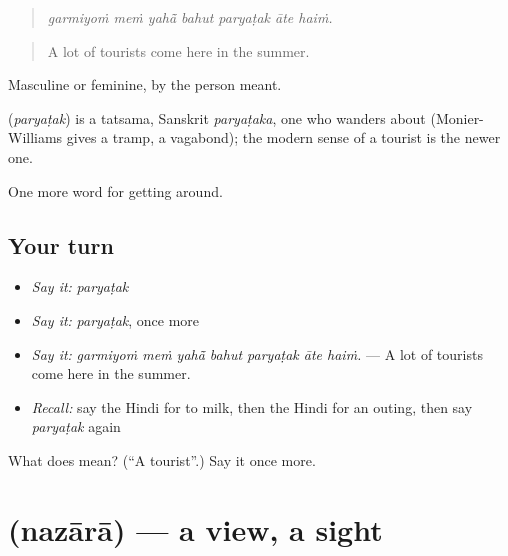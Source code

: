 \begin{quote}
      
\end{quote}

\begin{quote}
\emph{garmiyoṁ meṁ yahā̃ bahut paryaṭak āte haiṁ.}
\end{quote}

\begin{quote}
A lot of tourists come here in the summer.
\end{quote}

Masculine or feminine, by the person meant.

\begin{cousinweb}
\textbf{} (\emph{paryaṭak}) is a tatsama, Sanskrit \emph{paryaṭaka}, one who wanders about (Monier-Williams gives a tramp, a vagabond); the modern sense of a tourist is the newer one.
\end{cousinweb}

\begin{grammarlens}[title={What you've built}]
One more word for getting around.
\end{grammarlens}

\subsection*{Your turn}
\begin{itemize}
\raggedright
  \item \emph{Say it:} \emph{paryaṭak}
  \item \emph{Say it:} \emph{paryaṭak}, once more
  \item \emph{Say it:} \emph{garmiyoṁ meṁ yahā̃ bahut paryaṭak āte haiṁ.} — A lot of tourists come here in the summer.
  \item \emph{Recall:} say the Hindi for to milk, then the Hindi for an outing, then say \emph{paryaṭak} again
\end{itemize}

\begin{tcolorbox}[breakable,colback=teal!4,colframe=teal!35!black,title={Before you move on}]
What does  mean? (\textquotedblleft{}A tourist\textquotedblright{}.) Say it once more.
\end{tcolorbox}
\section[\texorpdfstring{\hi{नज़ारा} (nazārā)}{नज़ारा (nazārā)}]{ (nazārā) — a view, a sight}

